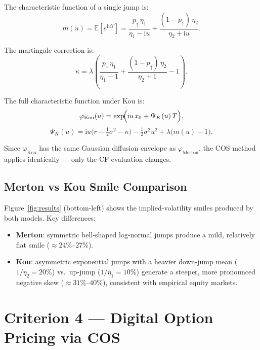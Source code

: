 \documentclass[12pt, a4paper]{article}
\theoremstyle{definition}
\newcommand{\E}{\mathbb{E}}
\newcommand{\ii}{\mathrm{i}}
\begin{document}
The characteristic function of a single jump is:
\begin{equation}
  m(u) = \E[e^{\ii u Y}]
       = \frac{p_{\uparrow}\,\eta_1}{\eta_1 - \ii u}
         + \frac{(1-p_{\uparrow})\,\eta_2}{\eta_2 + \ii u}.
\end{equation}

The martingale correction is:
\begin{equation}
  \kappa = \lambda\left(\frac{p_{\uparrow}\,\eta_1}{\eta_1-1}
           + \frac{(1-p_{\uparrow})\,\eta_2}{\eta_2+1} - 1\right).
\end{equation}

The full characteristic function under Kou is:
\begin{equation}\label{eq:kou_cf}
  \varphi_{\text{Kou}}(u)
  = \exp\!\Bigl(\ii u\,x_0 + \Psi_K(u)\,T\Bigr),
\end{equation}
\begin{equation}
  \Psi_K(u)
  = \ii u\bigl(r-\tfrac{1}{2}\sigma^2-\kappa\bigr)
    - \tfrac{1}{2}\sigma^2 u^2
    + \lambda\bigl(m(u)-1\bigr).
\end{equation}

Since $\varphi_{\text{Kou}}$ has the same Gaussian diffusion envelope as
$\varphi_{\text{Merton}}$, the COS method applies identically — only the CF
evaluation changes.

\subsection{Merton vs Kou Smile Comparison}

Figure~\ref{fig:results} (bottom-left) shows the implied-volatility smiles
produced by both models.  Key differences:

\begin{itemize}
  \item \textbf{Merton}: symmetric bell-shaped log-normal jumps produce a
        mild, relatively flat smile ($\approx 24\%$--$27\%$).
  \item \textbf{Kou}: asymmetric exponential jumps with a heavier down-jump
        mean ($1/\eta_2 = 20\%$) vs.\ up-jump ($1/\eta_1 = 10\%$) generate
        a steeper, more pronounced negative skew ($\approx 31\%$--$40\%$),
        consistent with empirical equity markets.
\end{itemize}

\section{Criterion 4 — Digital Option Pricing via COS}
\end{document}
